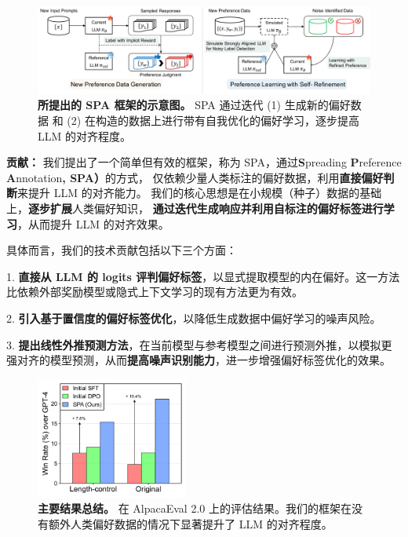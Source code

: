 \begin{figure}[t]
    \centering
    \includegraphics[width=1.0\textwidth]{figure/raw_files/main.pdf}
    \caption{\textbf{所提出的 SPA 框架的示意图。} SPA 通过迭代 (1) 生成新的偏好数据 和 (2) 在构造的数据上进行带有自我优化的偏好学习，逐步提高 LLM 的对齐程度。}
    \label{fig:illustration}
    \vspace{-0.1in}
\end{figure}

\textbf{贡献：}  
我们提出了一个简单但有效的框架，称为 SPA，通过\textbf{S}preading \textbf{P}reference \textbf{A}nnotation\textbf{, SPA）}的方式，
仅依赖少量人类标注的偏好数据，利用\textbf{直接偏好判断}来提升 LLM 的对齐能力。  
我们的核心思想是在小规模（种子）数据的基础上，\textbf{逐步扩展}人类偏好知识，
\textbf{通过迭代生成响应并利用自标注的偏好标签进行学习}，从而提升 LLM 的对齐效果。  

具体而言，我们的技术贡献包括以下三个方面：  

1. \textbf{直接从 LLM 的 logits 评判偏好标签}，以显式提取模型的内在偏好。这一方法比依赖外部奖励模型或隐式上下文学习的现有方法更为有效。

2. \textbf{引入基于置信度的偏好标签优化}，以降低生成数据中偏好学习的噪声风险。

3. \textbf{提出线性外推预测方法}，在当前模型与参考模型之间进行预测外推，以模拟更强对齐的模型预测，从而\textbf{提高噪声识别能力}，进一步增强偏好标签优化的效果。

\begin{figure}[t]
    \centering
	\includegraphics[width=50mm]{figure/raw_files/iclr25_spa_fig2.pdf}
	\vspace{-0.5cm}
    \caption{\textbf{主要结果总结。} 在 AlpacaEval 2.0 \citep{alpaca_eval} 上的评估结果。我们的框架在没有额外人类偏好数据的情况下显著提升了 LLM 的对齐程度。}
    \label{fig:summary}
\end{figure}

